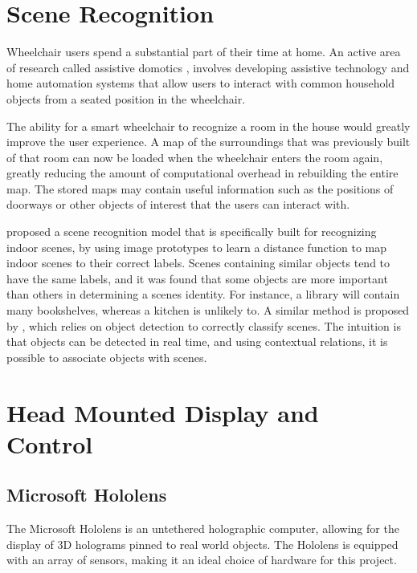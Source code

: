 \documentclass[12pt,a4paper]{report}
\begin{document}
\section{Scene Recognition} \label{section:Scene_Recognition}
Wheelchair users spend a substantial part of their time at home. An active area of research called assistive domotics \citep{Rosslin2010}, involves developing assistive technology and home automation systems that allow users to interact with common household objects from a seated position in the wheelchair.

The ability for a smart wheelchair to recognize a room in the house would greatly improve the user experience. A map of the surroundings that was previously built of that room can now be loaded when the wheelchair enters the room again, greatly reducing the amount of computational overhead in rebuilding the entire map. The stored maps may contain useful information such as the positions of doorways or other objects of interest that the users can interact with.

\cite{Quattoni2009} proposed a scene recognition model that is specifically built for recognizing indoor scenes, by using image prototypes to learn a distance function to map indoor scenes to their correct labels. Scenes containing similar objects tend to have the same labels, and it was found that some objects are more important than others in determining a scenes identity. For instance, a library will contain many bookshelves, whereas a kitchen is unlikely to. A similar method is proposed by \cite{Espinace2010}, which relies on object detection to correctly classify scenes. The intuition is that objects can be detected in real time, and using contextual relations, it is possible to associate objects with scenes.

\section{Head Mounted Display and Control}

\subsection{Microsoft Hololens}
The Microsoft Hololens is an untethered holographic computer, allowing for the display of 3D holograms pinned to real world objects. The Hololens is equipped with an array of sensors, making it an ideal choice of hardware for this project.
\end{document}
